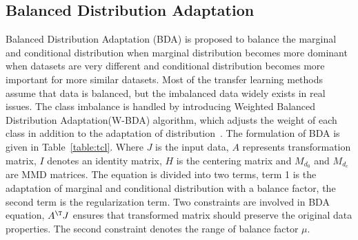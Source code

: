\subsection{Balanced Distribution Adaptation}
Balanced Distribution Adaptation (BDA) is proposed to balance the marginal and conditional distribution when marginal distribution becomes more dominant when datasets are very different and conditional distribution becomes more important for more similar datasets. Most of the transfer learning methods assume that data is balanced, but the imbalanced data widely exists in real issues. The class imbalance is handled by introducing Weighted Balanced Distribution Adaptation(W-BDA) algorithm, which adjusts the weight of each class in addition to the adaptation of distribution~\cite{wang2017}.
The formulation of BDA is given in Table~\ref{table:tcl}. Where $J$ is the input data, $A$ represents transformation matrix, $I$ denotes an identity matrix, $H$ is the centering matrix and $M_{d_0}$ and $M_{d_c}$ are MMD matrices. 
The equation is divided into two terms, term 1 is the adaptation of marginal and conditional distribution with a balance factor, the second term is the regularization term. Two constraints are involved in BDA equation, $A^\T J$ ensures that transformed matrix should preserve the original data properties. The second constraint denotes the range of balance factor $\mu$.

